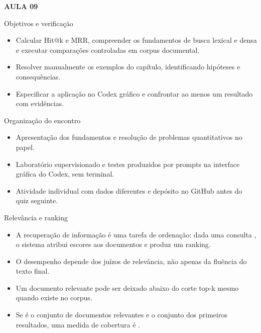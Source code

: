 \documentclass[10pt,aspectratio=169]{beamer}
\begin{document}
\begin{frame}[t]{}
\vspace{14mm}\textcolor{InsperRed}{\bfseries AULA 09}\par\vspace{4mm}{\LARGE\bfseries Avaliação da recuperação de informação}\par\vspace{6mm}{\large Finanças}\par{}
\end{frame}

\begin{frame}[t]{Objetivos e verificação}
\small
\begin{itemize}
\item Calcular Hit@k e MRR, compreender os fundamentos de busca lexical e densa e executar comparações controladas em corpus documental.
\item Resolver manualmente os exemplos do capítulo, identificando hipóteses e consequências.
\item Especificar a aplicação no Codex gráfico e confrontar ao menos um resultado com evidências.
\end{itemize}
\end{frame}

\begin{frame}[t]{Organização do encontro}
\small
\begin{itemize}
\item Apresentação dos fundamentos e resolução de problemas quantitativos no papel.
\item Laboratório supervisionado e testes produzidos por prompts na interface gráfica do Codex, sem terminal.
\item Atividade individual com dados diferentes e depósito no GitHub antes do quiz seguinte.
\end{itemize}
\end{frame}

\begin{frame}[t]{Relevância e ranking}
\small
\begin{itemize}
\item A recuperação de informação é uma tarefa de ordenação: dada uma consulta , o sistema atribui escores aos documentos e produz um ranking.
\item O desempenho depende dos juízos de relevância, não apenas da fluência do texto final.
\item Um documento relevante pode ser deixado abaixo do corte top-k mesmo quando existe no corpus.
\item Se é o conjunto de documentos relevantes e o conjunto dos primeiros resultados, uma medida de cobertura é .
\end{itemize}
\end{frame}
\end{document}
